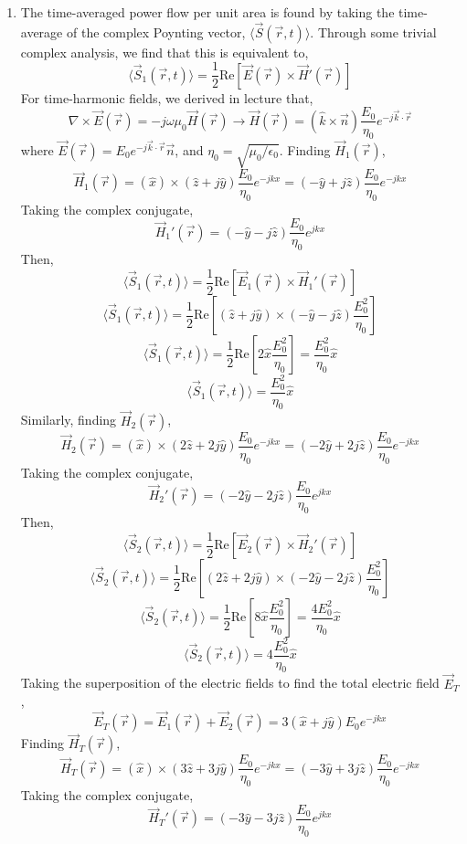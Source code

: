 \documentclass[12pt]{article}
\begin{document}
\begin{enumerate}
\begin{enumerate}
		\item [c.]
		The time-averaged power flow per unit area is found by taking the time-average of the complex Poynting vector, $\langle \vec S(\vec r, t)\rangle$. 
		Through some trivial complex analysis, we find that this is equivalent to,
		\[\langle \vec S_1(\vec r,t)\rangle = \frac{1}{2}\mathrm{Re}\left[\vec E(\vec r)\times \vec H'(\vec r)\right]\]
		For time-harmonic fields, we derived in lecture that,
		\[\nabla \times \vec E(\vec r)=-j\omega \mu_0\vec H(\vec r)\to \vec H(\vec r)=(\hat k \times \vec n)\frac{E_0}{\eta_0}e^{-j\vec k \cdot \vec r}\]
		where $\vec E(\vec r)=E_0e^{-j\vec k \cdot \vec r}\vec n$, and $\eta_0=\sqrt{\mu_0/\epsilon_0}$.
		Finding $\vec H_1(\vec r)$,
		\[\vec H_1(\vec r)=(\hat x)\times (\hat z + j\hat y)\frac{E_0}{\eta_0}e^{-jkx}=(-\hat y+j\hat z)\frac{E_0}{\eta_0}e^{-jkx}\]
		Taking the complex conjugate,
		\[\vec H_1'(\vec r)=(-\hat y - j\hat z)\frac{E_0}{\eta_0}e^{jkx}\]
		Then,
		\[\langle \vec S_1(\vec r, t)\rangle = \frac{1}{2}\mathrm{Re}\left[\vec E_1(\vec r)\times \vec H_1'(\vec r)\right]\]
		\[\langle \vec S_1(\vec r, t)\rangle = \frac{1}{2}\mathrm{Re}\left[(\hat z + j\hat y)\times (-\hat y - j\hat z)\frac{E_0^2}{\eta_0}\right]\]
		\[\langle \vec S_1(\vec r, t)\rangle = \frac{1}{2}\mathrm{Re}\left[2\hat x \frac{E_0^2}{\eta_0}\right]=\frac{E_0^2}{\eta_0}\hat x\]
		\[\boxed{\langle \vec S_1(\vec r, t)\rangle = \frac{E_0^2}{\eta_0}\hat x}\]
		Similarly, finding $\vec H_2(\vec r)$,
		\[\vec H_2(\vec r)=(\hat x)\times (2\hat z + 2j\hat y)\frac{E_0}{\eta_0}e^{-jkx}=(-2\hat y + 2j\hat z)\frac{E_0}{\eta_0}e^{-jkx}\]
		Taking the complex conjugate,
		\[\vec H_2'(\vec r)=(-2\hat y - 2j\hat z)\frac{E_0}{\eta_0}e^{jkx}\]
		Then,
		\[\langle \vec S_2(\vec r, t)\rangle = \frac{1}{2}\mathrm{Re}\left[\vec E_2(\vec r)\times \vec H_2'(\vec r)\right]\]
		\[\langle \vec S_2(\vec r, t)\rangle = \frac{1}{2}\mathrm{Re}\left[(2\hat z + 2j\hat y)\times (-2\hat y - 2j\hat z)\frac{E_0^2}{\eta_0}\right]\]
		\[\langle \vec S_2(\vec r, t)\rangle = \frac{1}{2}\mathrm{Re}\left[8\hat x \frac{E_0^2}{\eta_0}\right]=\frac{4E_0^2}{\eta_0}\hat x\]
		\[\boxed{\langle \vec S_2(\vec r, t)\rangle = 4\frac{E_0^2}{\eta_0}\hat x}\]
		Taking the superposition of the electric fields to find the total electric field $\vec E_T$,
		\[\vec E_T(\vec r)=\vec E_1(\vec r)+\vec E_2(\vec r)=3(\hat x+j\hat y)E_0e^{-jkx}\]
		Finding $\vec H_T(\vec r)$,
		\[\vec H_T(\vec r)=(\hat x)\times (3\hat z + 3j\hat y)\frac{E_0}{\eta_0}e^{-jkx}=(-3\hat y + 3j\hat z)\frac{E_0}{\eta_0}e^{-jkx}\]
		Taking the complex conjugate,
		\[\vec H_T'(\vec r)=(-3\hat y - 3j\hat z)\frac{E_0}{\eta_0}e^{jkx}\]

\end{enumerate}
\end{enumerate}
\end{document}
